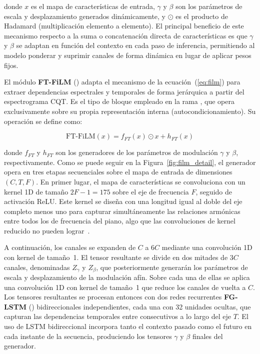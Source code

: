 \documentclass[11pt,spanish,listoffigures,listoftables]{tfgetsinf}
\begin{document}
\noindent donde $x$ es el mapa de características de entrada, $\gamma$ y $\beta$ son 
los parámetros de escala y desplazamiento generados dinámicamente, y $\odot$ es el 
producto de Hadamard (multiplicación elemento a elemento). El principal beneficio de 
este mecanismo respecto a la suma o concatenación directa de características es que 
$\gamma$ y $\beta$ se adaptan en función del contexto en cada paso de inferencia, 
permitiendo al modelo ponderar y suprimir canales de forma dinámica en lugar de 
aplicar pesos fijos.

El módulo \textbf{FT-FiLM} () adapta el 
mecanismo de la ecuación~(\ref{eq:film}) para extraer dependencias espectrales y 
temporales de forma jerárquica a partir del espectrograma CQT. Es el tipo de bloque 
empleado en la rama , que opera exclusivamente sobre su propia 
representación interna (autocondicionamiento). Su operación se define como:

\begin{equation}
  \text{FT-FiLM}(x) = f_{FT}(x) \odot x + h_{FT}(x)
  \label{eq:ftfilm}
\end{equation}

\noindent donde $f_{FT}$ y $h_{FT}$ son los generadores de los parámetros de 
modulación $\gamma$ y $\beta$, respectivamente. Como se puede seguir en la 
Figura~\ref{fig:film_detail}, el generador opera en tres etapas secuenciales 
sobre el mapa de entrada de dimensiones $(C, T, F)$. En primer lugar, el mapa de 
características se convoluciona con un kernel 1D de tamaño $2F - 1 = 175$ sobre 
el eje de frecuencia $F$, seguido de activación ReLU. Este kernel se diseña con 
una longitud igual al doble del eje completo menos uno para capturar 
simultáneamente las relaciones armónicas entre todos los  
de frecuencia del piano, algo que las convoluciones de kernel reducido no pueden 
lograr~\cite{wang2025mftfilm}.

A continuación, los canales se expanden de $C$ a $6C$ mediante una convolución 1D 
con kernel de tamaño~1. El tensor resultante se divide en dos mitades de $3C$ 
canales, denominadas $Z_\gamma$ y $Z_\beta$, que posteriormente generarán los 
parámetros de escala y desplazamiento de la modulación afín. Sobre cada una de 
ellas se aplica una convolución 1D con kernel de tamaño~1 que reduce los canales 
de vuelta a $C$. Los tensores resultantes se procesan entonces con dos redes 
recurrentes \textbf{FG-LSTM} () 
bidireccionales independientes, cada una con 32 unidades ocultas, que capturan 
las dependencias temporales entre  consecutivos a lo 
largo del eje $T$. El uso de LSTM bidireccional incorpora tanto el contexto 
pasado como el futuro en cada instante de la secuencia, produciendo los tensores 
$\gamma$ y $\beta$ finales del generador.
\end{document}
